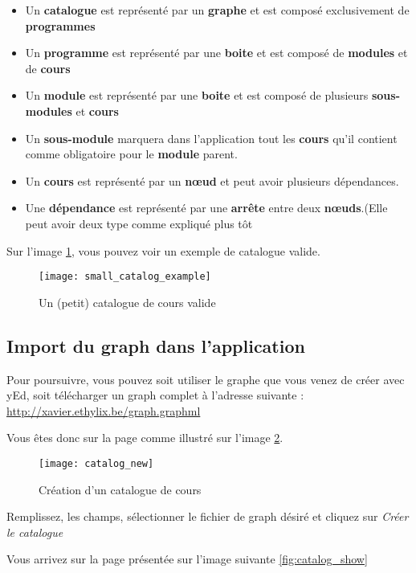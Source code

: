 \begin{itemize}
\item Un \textbf{catalogue} est représenté par un \textbf{graphe} et est composé exclusivement de \textbf{programmes}
\item Un \textbf{programme} est représenté par une \textbf{boite} et est composé de \textbf{modules} et de \textbf{cours}
\item Un \textbf{module} est représenté par une \textbf{boite} et est composé de plusieurs \textbf{sous-modules} et \textbf{cours}
\item Un \textbf{sous-module} marquera dans l'application tout les \textbf{cours} qu'il contient comme obligatoire pour le \textbf{module} parent.
\item Un \textbf{cours} est représenté par un \textbf{nœud} et peut avoir plusieurs dépendances. 
\item Une \textbf{dépendance} est représenté par une \textbf{arrête} entre deux \textbf{nœuds}.(Elle peut avoir deux type comme expliqué plus tôt
\end{itemize}

Sur l'image \ref{fig:small_catalog_example}, vous pouvez voir un exemple de catalogue valide.

\begin{figure}[H]
\centering
\texttt{[image: small\_catalog\_example]}
\label{fig:small_catalog_example}
\caption{Un (petit) catalogue de cours valide}

\end{figure}

\subsection{Import du graph dans l'application}
Pour poursuivre, vous pouvez soit utiliser le graphe que vous venez de créer avec yEd, soit télécharger un graph complet à l'adresse suivante : \url{http://xavier.ethylix.be/graph.graphml}

Vous êtes donc sur la page comme illustré sur l'image \ref{fig:catalog_new}.

\begin{figure}[H]
\centering
\caption{Création d'un catalogue de cours}
\label{fig:catalog_new}
\texttt{[image: catalog\_new]}
\end{figure}

Remplissez, les champs, sélectionner le fichier de graph désiré et cliquez sur \textit{Créer le catalogue}

Vous arrivez sur la page présentée sur l'image suivante \ref{fig:catalog_show}

